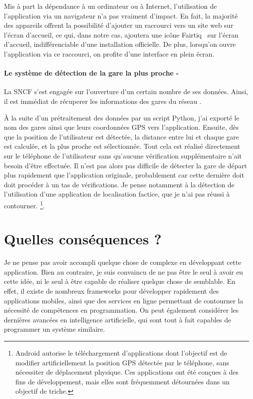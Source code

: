 \documentclass[a4paper]{article}
\begin{document}
Mis à part la dépendance à un ordinateur ou à Internet, l'utilisation
de l'application via un navigateur n'a pas vraiment d'impact. En fait,
la majorité des appareils offrent la possibilité d'ajouter un raccourci
vers un site web sur l'écran d'accueil, ce qui, dans notre cas, ajoutera
une icône \og Fairtiq \fg\ sur l'écran d'accueil, indifférenciable d'une installation
officielle. De plus, lorsqu'on ouvre l'application via ce raccourci, on profite
d'une interface en plein écran. %


\paragraph*{Le système de détection de la gare la plus proche - }
La SNCF s'est engagée sur l'ouverture d'un certain nombre de ses données.
Ainsi, il est immédiat de récuperer les informations
des gares du réseau \cite{gares-data}.

À la suite d'un prétraitement des données par un script Python, j'ai exporté
le nom des gares ainsi que leurs coordonnées GPS vers l'application. Ensuite, dès que la
position de l'utilisateur est détectée, la distance entre lui et chaque gare est calculée, et la plus proche est
sélectionnée. Tout cela est réalisé directement sur le téléphone de l'utilisateur sans
qu'aucune vérification supplémentaire n'ait besoin d'être effectuée.  Il n'est pas alors pas difficile de
détecter la gare de départ plus rapidement que l'application originale, probablement car cette dernière doit
doit procéder à un tas de vérifications. Je pense notamment
à la détection de l'utilisation d'une application de localisation factice, que je n'ai
pas réussi à contourner.
\footnote{
  Android autorise le téléchargement d'applications dont l'objectif est
  de modifier artificiellement la position GPS détectée par le téléphone, sans
  nécessiter de déplacement physique. Ces applications ont été conçues à des fins
  de développement, mais elles sont fréquemment détournées dans un objectif de triche.
}.

\clearpage


\section{Quelles conséquences ?}
\label{sec:consequences}

Je ne pense pas avoir accompli quelque chose de complexe en développant cette application.
Bien au contraire, je suis convaincu de ne pas être le seul à avoir eu cette idée, ni le seul
à être capable de réaliser quelque chose de semblable. En effet, il existe de nombreux frameworks
pour développer rapidement des applications mobiles, ainsi que des services en ligne
permettant de contourner la nécessité de compétences en programmation. On peut également
considérer les dernières avancées en intelligence artificielle, qui sont tout à fait
capables de programmer un système similaire.
\end{document}
